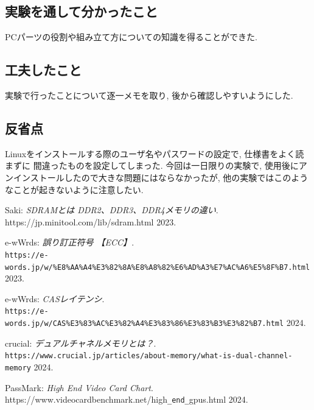\documentclass{ltjsarticle} %
\begin{document}
\subsection{実験を通して分かったこと}
PCパーツの役割や組み立て方についての知識を得ることができた.

\subsection{工夫したこと}
実験で行ったことについて逐一メモを取り, 後から確認しやすいようにした.

\subsection{反省点}
Linuxをインストールする際のユーザ名やパスワードの設定で, 仕様書をよく読まずに
間違ったものを設定してしまった. 今回は一日限りの実験で, 使用後にアンインストールしたので大きな問題にはならなかったが, 
他の実験ではこのようなことが起きないように注意したい. 

\begin{thebibliography}{99} %
  
  Saki: 
  \emph{SDRAMとは DDR2、DDR3、DDR4メモリの違い}. \\
  https://jp.minitool.com/lib/sdram.html  2023.

  e-wWrds: 
  \emph{誤り訂正符号 【ECC】}. \\
  \verb|https://e-words.jp/w/%E8%AA%A4%E3%82%8A%E8%A8%82%E6%AD%A3%E7%AC%A6%E5%8F%B7.html|  2023.

  e-wWrds: 
  \emph{CASレイテンシ}. \\
  \verb|https://e-words.jp/w/CAS%E3%83%AC%E3%82%A4%E3%83%86%E3%83%B3%E3%82%B7.html|  2024.

  crucial: 
  \emph{デュアルチャネルメモリとは？}. \\
  \verb|https://www.crucial.jp/articles/about-memory/what-is-dual-channel-memory|  2024.

  PassMark: 
  \emph{High End Video Card Chart}. \\
  https://www.videocardbenchmark.net/high\verb|_end_|gpus.html  2024.

\end{thebibliography}
\end{document}
